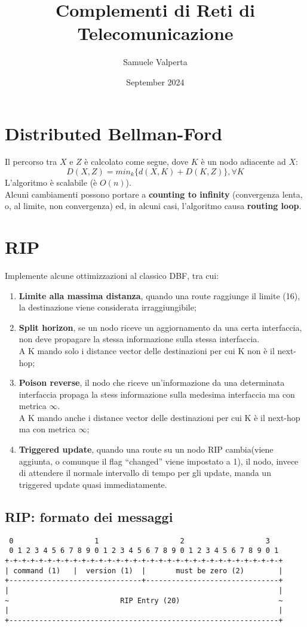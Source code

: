 \documentclass{article}
\title{Complementi di Reti di Telecomunicazione}
\author{Samuele Valperta}
\date{September 2024}
\begin{document}
\maketitle

\section{Distributed Bellman-Ford}
Il percorso tra $X$ e $Z$ è calcolato come segue, dove $K$ è un nodo adiacente ad $X$:
$$D(X,Z)=min_{k}\{ d(X,K)+D(K,Z) \}, \forall K$$
L’algoritmo è scalabile (è $O(n)$).\\
Alcuni cambiamenti possono portare a \textbf{counting to infinity} (convergenza lenta, o, al limite, non convergenza) ed, in alcuni casi, l’algoritmo causa \textbf{routing loop}.
\section{RIP}
Implemente alcune ottimizzazioni al classico DBF, tra cui:
\begin{enumerate}
    \item \textbf{Limite alla massima distanza}, quando una route raggiunge il limite (16), la destinazione viene considerata irraggiungibile;
    \item \textbf{Split horizon}, se un nodo riceve un aggiornamento da una certa interfaccia, non deve propagare la stessa informazione sulla stessa interfaccia.\\
    A K mando solo i distance vector delle destinazioni per cui K non è il next-hop;
    \item \textbf{Poison reverse}, il nodo che riceve un'informazione da una determinata interfaccia propaga la stess informazione sulla medesima interfaccia ma con metrica $\infty$.\\
    A K mando anche i distance vector delle destinazioni per cui K è il next-hop ma con metrica $\infty$;
    \item \textbf{Triggered update}, quando una route su un nodo RIP cambia(viene aggiunta, o comunque il flag “changed” viene impostato a 1), il nodo, invece di attendere il normale intervallo di tempo per gli update, manda un triggered update quasi immediatamente.
\end{enumerate}
\newpage
\subsection{RIP: formato dei messaggi}
\begin{verbatim}
 0                   1                   2                   3
 0 1 2 3 4 5 6 7 8 9 0 1 2 3 4 5 6 7 8 9 0 1 2 3 4 5 6 7 8 9 0 1
+-+-+-+-+-+-+-+-+-+-+-+-+-+-+-+-+-+-+-+-+-+-+-+-+-+-+-+-+-+-+-+-+
| command (1)   |  version (1)  |       must be zero (2)        |
+-------------------------------+-------------------------------+
|                                                               |
~                          RIP Entry (20)                       ~
|                                                               |
+---------------------------------------------------------------+
\end{verbatim}
\end{document}

